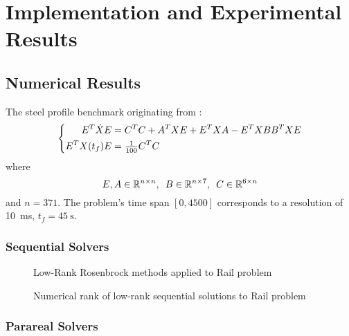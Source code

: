 \chapter{Implementation and Experimental Results}
\label{sec:results}




\section{Numerical Results}


\begin{example}
The steel profile benchmark \cite{morwiki_steel} originating from \cite{Benner2005}:
\label{thm:results:rail}
\begin{equation}
\left\{
\begin{aligned}
  E^T \dot X E &= C^T C + A^T X E + E^T X A - E^T X BB^T X E \\
  E^T X(t_f) E &= \tfrac{1}{100} C^T C
\end{aligned}
\right.
\end{equation}
where
\begin{equation}
  E, A \in \mathbb{R}^{n\times n},
  \enspace
  B \in \mathbb{R}^{n \times 7},
  \enspace
  C \in \mathbb{R}^{6 \times n}
\end{equation}
and $n=371$.
The problem's time span $[0,4500]$ corresponds to a resolution of \SI{10}{\milli\second},
\ie $t_f = \SI{45}{\second}$.
\end{example}

\subsection{Sequential Solvers}

\begin{figure}[t]
  \caption{Low-Rank Rosenbrock methods applied to Rail problem}
  \label{fig:results:sequential:rail}
\end{figure}

\begin{figure}[t]
  \caption{Numerical rank of low-rank sequential solutions to Rail problem}
\end{figure}

\subsection{Parareal Solvers}
\label{sec:results:parareal}

